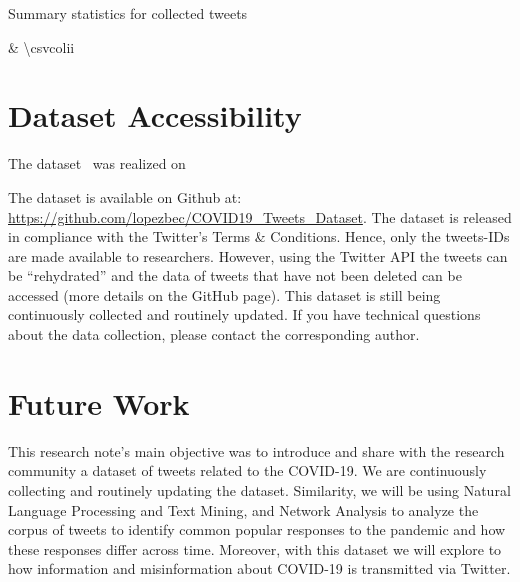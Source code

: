 \documentclass{article}
\begin{document}
\begin{table}[!h]
    \caption{Summary statistics for collected tweets}
    \label{tab:summary}
    {\csvcoli & \num[group-separator={,}]{\csvcolii}}
\end{table}

\section{Dataset Accessibility}

The dataset \version\ was realized on \date. The dataset is available on Github at:  \url{https://github.com/lopezbec/COVID19_Tweets_Dataset}. The dataset is released in compliance with the Twitter’s Terms \& Conditions. Hence, only the tweets-IDs are made available to researchers. However, using the Twitter API the tweets can be “rehydrated” and the data of tweets that have not been deleted can be accessed (more details on the GitHub page). This dataset is still being continuously collected and routinely updated. If you have technical questions about the data collection, please contact the corresponding author.


\section{Future Work}

This research note’s main objective was to introduce and share with the research community a dataset of tweets related to the COVID-19. We are continuously collecting and routinely updating the dataset. Similarity, we will be using Natural Language Processing and Text Mining, and Network Analysis to analyze the corpus of tweets to identify common popular responses to the pandemic and how these responses differ across time. Moreover, with this dataset we will explore to how information and misinformation about COVID-19 is transmitted via Twitter.
\end{document}

